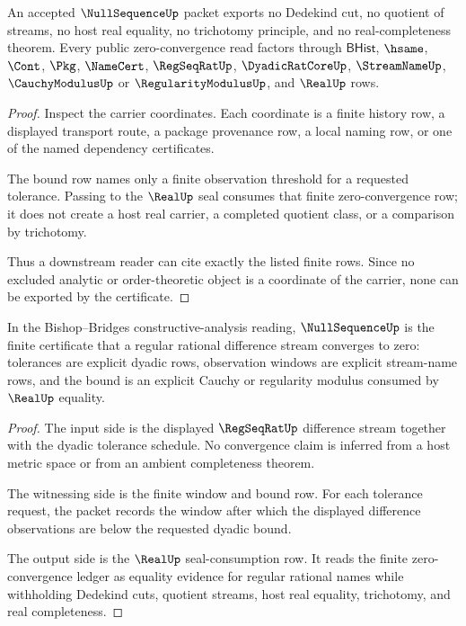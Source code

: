 \begin{theorem}
\label{thm:null-sequence-non-escape-boundary}
An accepted $\NullSequenceUp$ packet exports no Dedekind cut, no quotient of streams, no host real equality, no trichotomy principle, and no real-completeness theorem. Every public zero-convergence read factors through $\mathsf{BHist}$, $\hsame$, $\Cont$, $\Pkg$, $\NameCert$, $\RegSeqRatUp$, $\DyadicRatCoreUp$, $\StreamNameUp$, $\CauchyModulusUp$ or $\RegularityModulusUp$, and $\RealUp$ rows.
\end{theorem}
\begin{proof}
Inspect the carrier coordinates. Each coordinate is a finite history row, a displayed transport route, a package provenance row, a local naming row, or one of the named dependency certificates.

The bound row names only a finite observation threshold for a requested tolerance. Passing to the $\RealUp$ seal consumes that finite zero-convergence row; it does not create a host real carrier, a completed quotient class, or a comparison by trichotomy.

Thus a downstream reader can cite exactly the listed finite rows. Since no excluded analytic or order-theoretic object is a coordinate of the carrier, none can be exported by the certificate.
\end{proof}

\begin{theorem}
\label{thm:null-sequence-standard-bishop-reading}
In the Bishop--Bridges constructive-analysis reading, $\NullSequenceUp$ is the finite certificate that a regular rational difference stream converges to zero: tolerances are explicit dyadic rows, observation windows are explicit stream-name rows, and the bound is an explicit Cauchy or regularity modulus consumed by $\RealUp$ equality.
\end{theorem}
\begin{proof}
The input side is the displayed $\RegSeqRatUp$ difference stream together with the dyadic tolerance schedule. No convergence claim is inferred from a host metric space or from an ambient completeness theorem.

The witnessing side is the finite window and bound row. For each tolerance request, the packet records the window after which the displayed difference observations are below the requested dyadic bound.

The output side is the $\RealUp$ seal-consumption row. It reads the finite zero-convergence ledger as equality evidence for regular rational names while withholding Dedekind cuts, quotient streams, host real equality, trichotomy, and real completeness.
\end{proof}

